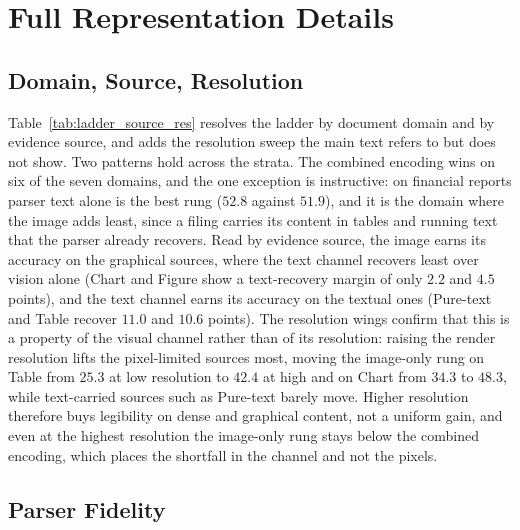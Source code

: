 \newpage




\section{Full Representation Details}
\label{app:add_representation}

\subsection{Domain, Source, Resolution}
\label{app:ladder_strata}

Table~\ref{tab:ladder_source_res} resolves the ladder by document domain and by evidence source, and adds the resolution sweep the main text refers to but does not show. Two patterns hold across the strata. The combined encoding wins on six of the seven domains, and the one exception is instructive: on financial reports parser text alone is the best rung ($52.8$ against $51.9$), and it is the domain where the image adds least, since a filing carries its content in tables and running text that the parser already recovers. Read by evidence source, the image earns its accuracy on the graphical sources, where the text channel recovers least over vision alone (Chart and Figure show a text-recovery margin of only $2.2$ and $4.5$ points), and the text channel earns its accuracy on the textual ones (Pure-text and Table recover $11.0$ and $10.6$ points). The resolution wings confirm that this is a property of the visual channel rather than of its resolution: raising the render resolution lifts the pixel-limited sources most, moving the image-only rung on Table from $25.3$ at low resolution to $42.4$ at high and on Chart from $34.3$ to $48.3$, while text-carried sources such as Pure-text barely move. Higher resolution therefore buys legibility on dense and graphical content, not a uniform gain, and even at the highest resolution the image-only rung stays below the combined encoding, which places the shortfall in the channel and not the pixels.

\subsection{Parser Fidelity}
\label{app:parser_fidelity}

